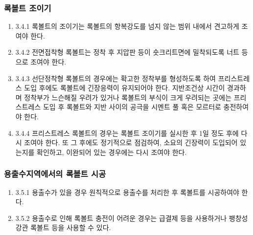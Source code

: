 \subsubsection{록볼트 조이기}
\begin{enumerate}
\item  3.4.1 록볼트의 조이기는 록볼트의 항복강도를 넘지 않는 범위 내에서 견고하게 조여야 한다.  
\item  3.4.2 전면접착형 록볼트는 정착 후 지압판 등이 숏크리트면에 밀착되도록 너트 등으로 조여야 한다.  
\item  3.4.3 선단정착형 록볼트의 경우에는 확고한 정착부를 형성하도록 하여 프리스트레스 도입 후에도 록볼트에 긴장응력이 유지되어야 한다. 지반조건상 시간이 경과하며 정착부가 느슨해질 우려가 있거나 록볼트의 부식이 크게 우려되는 곳에는 프리스트레스 도입 후 록볼트와 지반 사이의 공극을 시멘트 풀 혹은 모르터로 충전하여야 한다.  
\item  3.4.4 프리스트레스 록볼트의 경우는 록볼트 조이기를 실시한 후 1일 정도 후에 다시 조여야 한다. 또 그 후에도 정기적으로 점검하여, 소요의 긴장력이 도입되어 있는지를 확인하고, 이완되어 있는 경우에는 다시 조여야 한다.  
\end{enumerate}

\subsubsection{용출수지역에서의 록볼트 시공}
\begin{enumerate}
\item  3.5.1 용출수가 있을 경우 원칙적으로 용출수를 처리한 후 록볼트를 시공하여야 한다.  
\item  3.5.2 용출수로 인해 록볼트 충전이 어려운 경우는 급결제 등을 사용하거나 팽창성 강관 록볼트 등을 사용할 수 있다.  
\end{enumerate}

